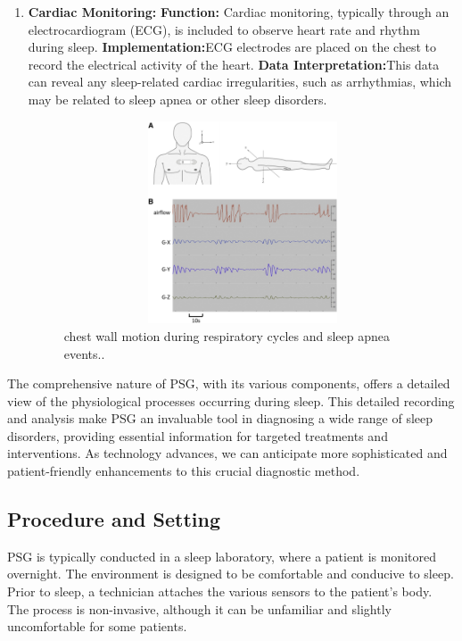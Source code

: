 \documentclass[12pt, a4paper,oneside]{book}
\numberwithin{equation}{section}
\begin{document}
\begin{enumerate}
\item \textbf{ Cardiac Monitoring:} \newline
\textbf{Function:} Cardiac monitoring, typically through an electrocardiogram (ECG), is included to observe heart rate and rhythm during sleep.
\newline \textbf{Implementation:}ECG electrodes are placed on the chest to record the electrical activity of the heart.
\newline \textbf{Data Interpretation:}This data can reveal any sleep-related cardiac irregularities, such as arrhythmias, which may be related to sleep apnea or other sleep disorders.\newline
 \begin{figure}[htb]
\centerline{\includegraphics[height=6cm,width=15cm]{ecg.jpg}}
\caption{chest wall motion during respiratory cycles and sleep apnea events.\cite{Hsu2020}.}
\label{fig:A3.3}
\end{figure}



\end{enumerate}
The comprehensive nature of PSG, with its various components, offers a detailed view of the physiological processes occurring during sleep. This detailed recording and analysis make PSG an invaluable tool in diagnosing a wide range of sleep disorders, providing essential information for targeted treatments and interventions. As technology advances, we can anticipate more sophisticated and patient-friendly enhancements to this crucial diagnostic method.

\subsection{Procedure and Setting}\label{2.3.2}
PSG is typically conducted in a sleep laboratory, where a patient is monitored overnight. The environment is designed to be comfortable and conducive to sleep. Prior to sleep, a technician attaches the various sensors to the patient's body. The process is non-invasive, although it can be unfamiliar and slightly uncomfortable for some patients.
\end{document}

